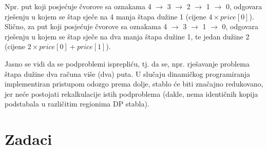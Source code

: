   Npr. put koji posjećuje čvorove sa oznakama 4 $\rightarrow$ 3 $\rightarrow$ 2 $\rightarrow$ 1 $\rightarrow$ 0, odgovara rješenju u kojem se štap sječe na 4 manja štapa dužine 1 (cijene $4 \times price[0]$). Slično, za put koji posjećuje čvorove sa oznakama 4 $\rightarrow$ 3 $\rightarrow$ 1 $\rightarrow$ 0, odgovara rješenju u kojem se štap sječe na dva manja štapa dužine 1, te jedan dužine 2 (cijene $2 \times price[0] + price[1]$).   
  
   Jasno se vidi da se podproblemi isprepliću, tj. da se, npr. rješavanje problema štapa dužine dva računa više (dva) puta. U slučaju dinamičkog programiranja implementiran  pristupom odozgo prema dolje, stablo će biti značajno redukovano, jer neće postojati rekalkulacije istih podproblema (dakle, nema identičnih kopija podstabala u različitim regionima DP stabla). 
 

\section*{Zadaci}

